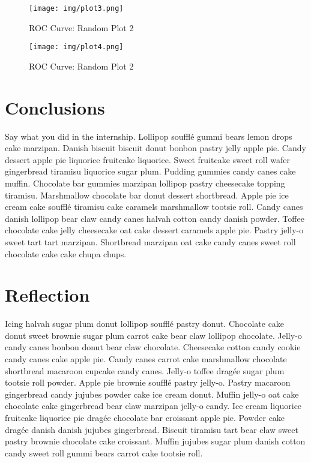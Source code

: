 \documentclass[11pt]{article}
\begin{document}
\begin{figure}[H]
  \centering
  \begin{minipage}[b]{0.4\textwidth}
    \texttt{[image: img/plot3.png]}
    \caption{ROC Curve: Random Plot 2}
    \label{fig:Wrong_Orientation}
  \end{minipage}
  \hfill
  \begin{minipage}[b]{0.4\textwidth}
    \texttt{[image: img/plot4.png]}
    \caption{ROC Curve: Random Plot 2}
    \label{fig:Unusual}
  \end{minipage}
\end{figure}





\section{Conclusions}

Say what you did in the internship. Lollipop soufflé gummi bears lemon drops cake marzipan. Danish biscuit biscuit donut bonbon pastry jelly apple pie. Candy dessert apple pie liquorice fruitcake liquorice. Sweet fruitcake sweet roll wafer gingerbread tiramisu liquorice sugar plum. Pudding gummies candy canes cake muffin. Chocolate bar gummies marzipan lollipop pastry cheesecake topping tiramisu. Marshmallow chocolate bar donut dessert shortbread. Apple pie ice cream cake soufflé tiramisu cake caramels marshmallow tootsie roll. Candy canes danish lollipop bear claw candy canes halvah cotton candy danish powder. Toffee chocolate cake jelly cheesecake oat cake dessert caramels apple pie. Pastry jelly-o sweet tart tart marzipan. Shortbread marzipan oat cake candy canes sweet roll chocolate cake cake chupa chups.



\section{Reflection}


Icing halvah sugar plum donut lollipop soufflé pastry donut. Chocolate cake donut sweet brownie sugar plum carrot cake bear claw lollipop chocolate. Jelly-o candy canes bonbon donut bear claw chocolate. Cheesecake cotton candy cookie candy canes cake apple pie. Candy canes carrot cake marshmallow chocolate shortbread macaroon cupcake candy canes. Jelly-o toffee dragée sugar plum tootsie roll powder. Apple pie brownie soufflé pastry jelly-o. Pastry macaroon gingerbread candy jujubes powder cake ice cream donut. Muffin jelly-o oat cake chocolate cake gingerbread bear claw marzipan jelly-o candy. Ice cream liquorice fruitcake liquorice pie dragée chocolate bar croissant apple pie. Powder cake dragée danish danish jujubes gingerbread. Biscuit tiramisu tart bear claw sweet pastry brownie chocolate cake croissant. Muffin jujubes sugar plum danish cotton candy sweet roll gummi bears carrot cake tootsie roll.
\end{document}
